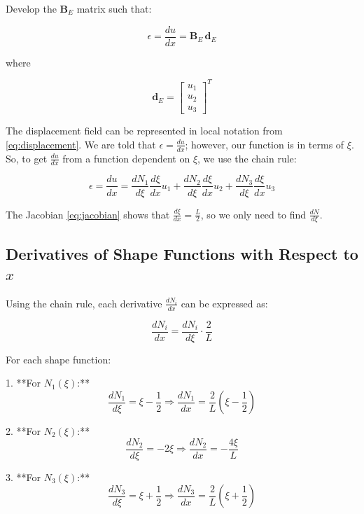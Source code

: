 Develop the \( \mathbf{B}_E \) matrix such that:

\begin{equation}
    \epsilon = \frac{du}{dx} = \mathbf{B}_E \, \mathbf{d}_E
\end{equation}

where

\begin{equation}
    \mathbf{d}_E = \begin{bmatrix} u_1 \\ u_2 \\ u_3 \end{bmatrix}^T
\end{equation}

The displacement field can be represented in local notation from \eqref{eq:displacement}.
We are told that \( \epsilon = \frac{du}{dx} \); however, our function is in terms of \( \xi \).
So, to get \( \frac{du}{dx} \) from a function dependent on \( \xi \), we use the chain rule:

\begin{equation}
    \epsilon = \frac{du}{dx} = \frac{dN_1}{d\xi} \frac{d\xi}{dx} u_1 + \frac{dN_2}{d\xi} \frac{d\xi}{dx} u_2 + \frac{dN_3}{d\xi} \frac{d\xi}{dx} u_3
\end{equation}

The Jacobian \eqref{eq:jacobian} shows that \( \frac{d\xi}{dx} = \frac{L}{2} \), so we only need to find \( \frac{dN}{d\xi} \).

\subsection*{Derivatives of Shape Functions with Respect to \( x \)}

Using the chain rule, each derivative \( \frac{dN_i}{dx} \) can be expressed as:

\[
\frac{dN_i}{dx} = \frac{dN_i}{d\xi} \cdot \frac{2}{L}
\]

For each shape function:

1. **For \( N_1(\xi) \):**
   \[
   \frac{dN_1}{d\xi} = \xi - \frac{1}{2} \Rightarrow \frac{dN_1}{dx} = \frac{2}{L} \left( \xi - \frac{1}{2} \right)
   \]

2. **For \( N_2(\xi) \):**
   \[
   \frac{dN_2}{d\xi} = -2\xi \Rightarrow \frac{dN_2}{dx} = -\frac{4\xi}{L}
   \]

3. **For \( N_3(\xi) \):**
   \[
   \frac{dN_3}{d\xi} = \xi + \frac{1}{2} \Rightarrow \frac{dN_3}{dx} = \frac{2}{L} \left( \xi + \frac{1}{2} \right)
   \]

